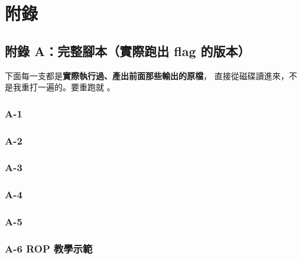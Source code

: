 \section{附錄}
\label{chap:appendix}

\subsection{附錄 A：完整腳本（實際跑出 flag 的版本）}

下面每一支都是\textbf{實際執行過、產出前面那些輸出的原檔}，
直接從磁碟讀進來，不是我重打一遍的。要重跑就 。

\subsubsection*{A-1 }



\subsubsection*{A-2 }



\subsubsection*{A-3 }



\subsubsection*{A-4 }



\subsubsection*{A-5 }



\subsubsection*{A-6 ROP 教學示範 }

